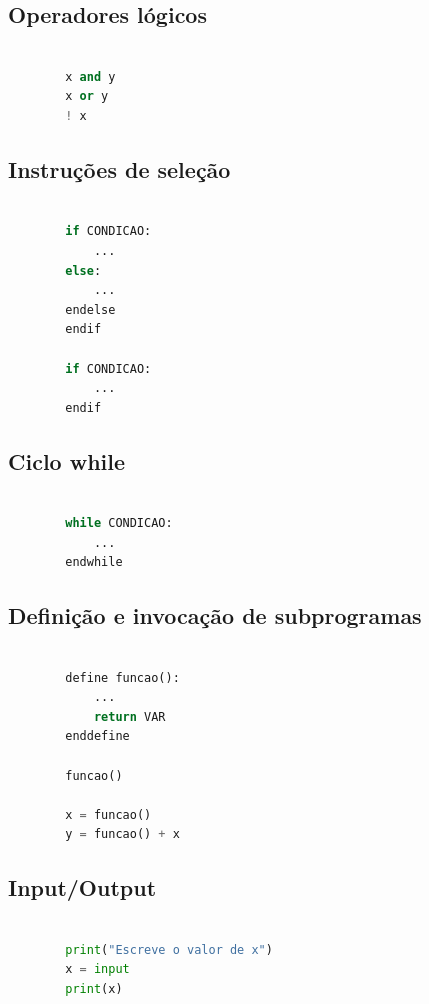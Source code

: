 \documentclass[11pt,a4paper]{report}
\begin{document}
    \subsection{Operadores lógicos}
    \begin{lstlisting}[language=Python]
    
        x and y
        x or y
        ! x
    \end{lstlisting}

    \subsection{Instruções de seleção}
    \begin{lstlisting}[language=Python]
    
        if CONDICAO:
            ...
        else:
            ...
        endelse
        endif

        if CONDICAO:
            ...
        endif
    \end{lstlisting}

    \subsection{Ciclo while}
    \begin{lstlisting}[language=Python]
    
        while CONDICAO:
            ...
        endwhile
    \end{lstlisting}

    \subsection{Definição e invocação de subprogramas}
    \begin{lstlisting}[language=Python]
    
        define funcao():
            ...
            return VAR
        enddefine

        funcao()

        x = funcao()
        y = funcao() + x
    \end{lstlisting}

    \subsection{Input/Output}
    \begin{lstlisting}[language=Python]
    
        print("Escreve o valor de x")
        x = input
        print(x)
    \end{lstlisting}
\end{document}
